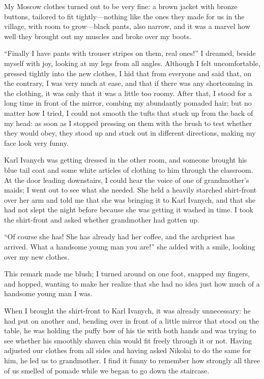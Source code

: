 My Moscow clothes turned out to be very fine: a brown jacket with bronze buttons, tailored to fit tightly---nothing like the ones they made for us in the village, with room to grow---black pants, also narrow, and it was a marvel how well they brought out my muscles and broke over my boots.

``Finally I have pants with trouser stripes on them, real ones!'' I dreamed, beside myself with joy, looking at my legs from all angles. Although I felt uncomfortable, pressed tightly into the new clothes, I hid that from everyone and said that, on the contrary, I was very much at ease, and that if there was any shortcoming in the clothing, it was only that it was a little too roomy. After that, I stood for a long time in front of the mirror, combing my abundantly pomaded hair; but no matter how I tried, I could not smooth the tufts that stuck up from the back of my head: as soon as I stopped pressing on them with the brush to test whether they would obey, they stood up and stuck out in different directions, making my face look very funny.

Karl Ivanych was getting dressed in the other room, and someone brought his blue tail coat and some white articles of clothing to him through the classroom. At the door leading downstairs, I could hear the voice of one of grandmother's maids; I went out to see what she needed. She held a heavily starched shirt-front over her arm and told me that she was bringing it to Karl Ivanych, and that she had not slept the night before because she was getting it washed in time. I took the shirt-front and asked whether grandmother had gotten up.

``Of course she has! She has already had her coffee, and the archpriest has arrived. What a handsome young man you are!'' she added with a smile, looking over my new clothes. %

This remark made me blush; I turned around on one foot, snapped my fingers, and hopped, wanting to make her realize that she had no idea just how much of a handsome young man I was.

When I brought the shirt-front to Karl Ivanych, it was already unnecessary: he had put on another and, bending over in front of a little mirror that stood on the table, he was holding the puffy bow of his tie with both hands and was trying to see whether his smoothly shaven chin would fit freely through it or not. Having adjusted our clothes from all sides and having asked Nikolai to do the same for him, he led us to grandmother. I find it funny to remember how strongly all three of us smelled of pomade while we began to go down the staircase.

